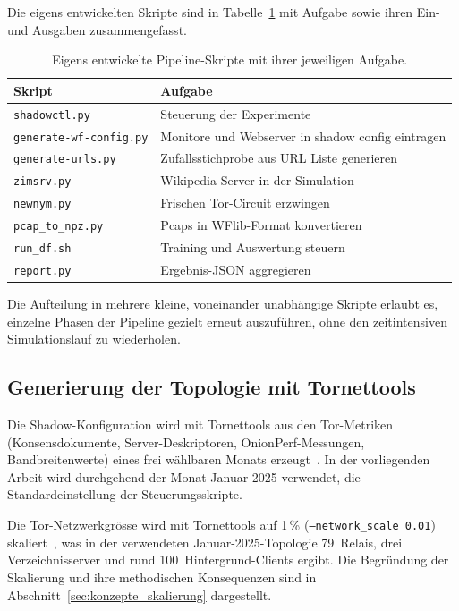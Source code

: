 Die eigens entwickelten Skripte sind in Tabelle~\ref{tab:werkzeugkette_skripte} mit Aufgabe sowie ihren Ein- und Ausgaben zusammengefasst.

\begin{table}[H]
\centering
\footnotesize
\caption{Eigens entwickelte Pipeline-Skripte mit ihrer jeweiligen Aufgabe.}
\label{tab:werkzeugkette_skripte}
\begin{tabularx}{\textwidth}{l >{\raggedright\arraybackslash}X}
\hline
Skript & Aufgabe \\
\hline
\texttt{shadowctl.py}          & Steuerung der Experimente \\
\texttt{generate-wf-config.py} & Monitore und Webserver in shadow config eintragen \\
\texttt{generate-urls.py}      & Zufallsstichprobe aus URL Liste generieren \\
\texttt{zimsrv.py}             & Wikipedia Server in der Simulation \\
\texttt{newnym.py}             & Frischen Tor-Circuit erzwingen \\
\texttt{pcap\_to\_npz.py}      & Pcaps in WFlib-Format konvertieren \\
\texttt{run\_df.sh}            & Training und Auswertung steuern \\
\texttt{report.py}             & Ergebnis-JSON aggregieren \\
\hline
\end{tabularx}
\end{table}

Die Aufteilung in mehrere kleine, voneinander unabhängige Skripte erlaubt es, einzelne Phasen der Pipeline gezielt erneut auszuführen, ohne den zeitintensiven Simulationslauf zu wiederholen.

\subsection{Generierung der Topologie mit Tornettools}

Die Shadow-Konfiguration wird mit Tornettools aus den Tor-Metriken (Konsensdokumente, Server-Deskriptoren, OnionPerf-Messungen, Bandbreitenwerte) eines frei wählbaren Monats erzeugt~\cite{neverenough-sec2021}.
In der vorliegenden Arbeit wird durchgehend der Monat Januar 2025 verwendet, die Standardeinstellung der Steuerungsskripte.

Die Tor-Netzwerkgrösse wird mit Tornettools auf 1\,\% (\texttt{--network\_scale 0.01}) skaliert~\cite{neverenough-sec2021}, was in der verwendeten Januar-2025-Topologie 79~Relais, drei Verzeichnisserver und rund 100~Hintergrund-Clients ergibt.
Die Begründung der Skalierung und ihre methodischen Konsequenzen sind in Abschnitt~\ref{sec:konzepte_skalierung} dargestellt.


